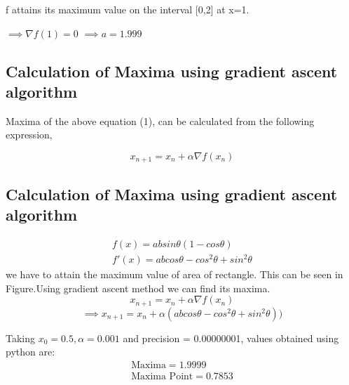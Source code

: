 \documentclass[10pt,twocolumn]{article}
\begin{document}
\begin{flushleft}
f attains its maximum value on the interval [0,2] at x=1.
\end{flushleft}
\center
$\implies \nabla f(1) =0$\endcenter
\center
$\implies a=1.999$\endcenter
\begin{flushleft}
\subsection{Calculation of Maxima using gradient ascent algorithm}
\end{flushleft}
\begin{flushleft}
Maxima of the above equation (1), can be calculated from the following expression,\\
\end{flushleft}
    \begin{equation}
        x_{n+1}= x_n + \alpha \nabla f(x_n)
    \end{equation}
    \begin{flushleft}
\subsection{Calculation of Maxima using gradient ascent algorithm}
\end{flushleft}
\begin{align}
	f(x) = absin\theta(1-cos\theta)\\
    f'(x) = abcos\theta-cos^2\theta+sin^2\theta
	\end{align}
we have to attain the maximum value of area of rectangle. This can be seen in Figure.Using gradient ascent method we can find its maxima.
\begin{equation}
        x_{n+1} = x_n + \alpha \nabla f(x_n) 
\end{equation}
\vspace{1mm}
\begin{equation}
\implies x_{n+1}=x_n+\alpha(abcos\theta-cos^2\theta+sin^2\theta))
\end{equation}

Taking $x_0=0.5,\alpha=0.001$ and precision = 0.00000001, values obtained using python are:
    \begin{align}
        \boxed{\text{Maxima} = 1.9999}\\     
        \boxed{\text{Maxima Point} = 0.7853}
    \end{align}
\endcenter
\end{document}
